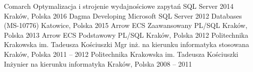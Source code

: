 

\begin{cventries}
	\cventry
		{Comarch}
		{Optymalizacja i strojenie wydajnościowe zapytań SQL Server 2014}
		{Kraków, Polska}
		{2016}
		{}
	\cventry
		{Dagma}
		{Developing Microsoft SQL Server 2012 Databases (MS-10776)}
		{Katowice, Polska}
		{2015}
		{}
	\cventry
		{Arrow ECS}
		{Zaawansowany PL/SQL}
		{Kraków, Polska}
		{2013}
		{}
	\cventry
		{Arrow ECS}
		{Podstawowy PL/SQL}
		{Kraków, Polska}
		{2012}
		{}
	\cventry
		{Politechnika Krakowska im. Tadeusza Kościuszki}
		{Mgr inż. na kierunku informatyka stosowana}
		{Kraków, Polska} 
		{2011 -- 2012}
		{}
	\cventry
		{Politechnika Krakowska im. Tadeusza Kościuszki}
		{Inżynier na kierunku informatyka}
		{Kraków, Polska}
		{2008 -- 2011} 
		{}
\end{cventries}
